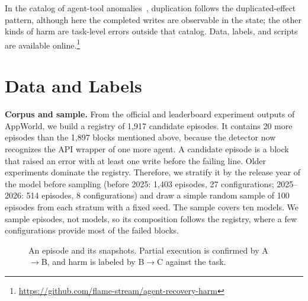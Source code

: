 \documentclass[conference]{IEEEtran}
\begin{document}
In the catalog of agent-tool anomalies~\cite{trofimov2026toolcallssucceedworkflows}, duplication follows the duplicated-effect pattern, although here the completed writes are observable in the state; the other kinds of harm are task-level errors outside that catalog. Data, labels, and scripts are available online.\footnote{\url{https://github.com/flame-stream/agent-recovery-harm}}

\section{Data and Labels}\label{sec:setting}

\textbf{Corpus and sample.} From the official and leaderboard experiment outputs of AppWorld, we build a registry of 1{,}917 candidate episodes. It contains 20 more episodes than the 1{,}897 blocks mentioned above, because the detector now recognizes the API wrapper of one more agent. A candidate episode is a block that raised an error with at least one write before the failing line. Older experiments dominate the registry. Therefore, we stratify it by the release year of the model before sampling (before 2025: 1{,}403 episodes, 27 configurations; 2025--2026: 514 episodes, 8 configurations) and draw a simple random sample of 100 episodes from each stratum with a fixed seed. The sample covers ten models. We sample episodes, not models, so its composition follows the registry, where a few configurations provide most of the failed blocks.

\begin{figure}[t]
\centering
{}
\caption{An episode and its snapshots. Partial execution is confirmed by A$\to$B, and harm is labeled by B$\to$C against the task.}
\label{fig:episode}
\end{figure}
\end{document}
